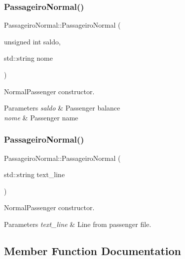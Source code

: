 \subsubsection{\texorpdfstring{Passageiro\+Normal()}{PassageiroNormal()}\hspace{0.1cm}{\footnotesize\ttfamily [1/2]}}
{\footnotesize\ttfamily Passageiro\+Normal\+::\+Passageiro\+Normal (\begin{DoxyParamCaption}\item[{unsigned int}]{saldo,  }\item[{std\+::string}]{nome }\end{DoxyParamCaption})}



Normal\+Passenger constructor. 


\begin{DoxyParams}{Parameters}
{\em saldo} & Passenger balance \\
\hline
{\em nome} & Passenger name \\
\hline
\end{DoxyParams}
\mbox{\label{class_passageiro_normal_a21a6239c0fea57fc7cc3e08248a4b287}} 
\subsubsection{\texorpdfstring{Passageiro\+Normal()}{PassageiroNormal()}\hspace{0.1cm}{\footnotesize\ttfamily [2/2]}}
{\footnotesize\ttfamily Passageiro\+Normal\+::\+Passageiro\+Normal (\begin{DoxyParamCaption}\item[{std\+::string}]{text\+\_\+line }\end{DoxyParamCaption})}



Normal\+Passenger constructor. 


\begin{DoxyParams}{Parameters}
{\em text\+\_\+line} & Line from passenger file. \\
\hline
\end{DoxyParams}


\subsection{Member Function Documentation}
\mbox{\label{class_passageiro_normal_a8761222e6cd84eb8185507a591845a46}} 
